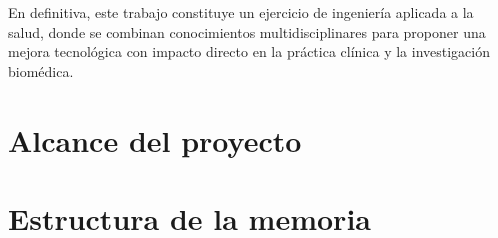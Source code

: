 En definitiva, este trabajo constituye un ejercicio de ingeniería aplicada a la salud, donde se combinan conocimientos
multidisciplinares para proponer una mejora tecnológica con impacto directo en la práctica clínica y la investigación biomédica.

\section{Alcance del proyecto}

\section{Estructura de la memoria}